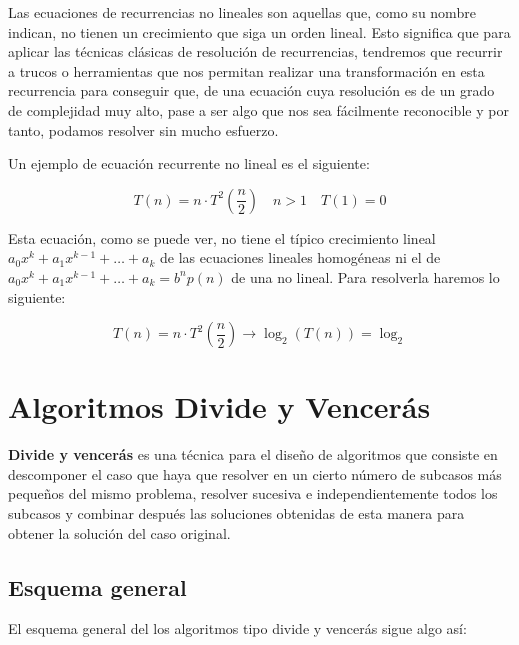 \documentclass[10pt,a4paper,spanish]{report}
\theoremstyle{definition}
\theoremstyle{remark}
\begin{document}
Las ecuaciones de recurrencias no lineales son aquellas que, como su nombre indican, no tienen un crecimiento que siga un orden lineal. Esto significa que para aplicar las técnicas clásicas de resolución de recurrencias, tendremos que recurrir a trucos o herramientas que nos permitan realizar una transformación en esta recurrencia para conseguir que, de una ecuación cuya resolución es de un grado de complejidad muy alto, pase a ser algo que nos sea fácilmente reconocible y por tanto, podamos resolver sin mucho esfuerzo.

Un ejemplo de ecuación recurrente no lineal es el siguiente:

\begin{displaymath}
    T(n) = n\cdot T^2\left(\frac{n}{2}\right) \quad n > 1 \quad T(1) = 0
\end{displaymath}

Esta ecuación, como se puede ver, no tiene el típico crecimiento lineal $a_0x^k + a_1x^{k-1}+\ldots+a_k$ de las ecuaciones lineales homogéneas ni el de $a_0x^k + a_1x^{k-1}+\ldots+a_k = b^np(n)$ de una no lineal. Para resolverla haremos lo siguiente:

\begin{center}
    \begin{displaymath}
        T(n) = n\cdot T^2\left(\frac{n}{2}\right) \longrightarrow \log_2(T(n)) = \log_2
    \end{displaymath}
\end{center}

\chapter{\textcolor[rgb]{0.2,0.5,0.5}Algoritmos \textcolor[rgb]{0.2,0.5,0.5}Divide y \textcolor[rgb]{0.2,0.5,0.5}Vencerás}

\textbf{\textcolor[rgb]{0.2,0.5,0.5}{Divide y vencerás}} es una técnica para el diseño de algoritmos que consiste en descomponer el caso que haya que resolver en un cierto número de subcasos más pequeños del mismo problema, resolver sucesiva e independientemente todos los subcasos y combinar después las soluciones obtenidas de esta manera para obtener la solución del caso original.

\section{\textcolor[rgb]{0.2,0.5,0.5}Esquema general}

El esquema general del los algoritmos tipo divide y vencerás sigue algo así:
\end{document}
